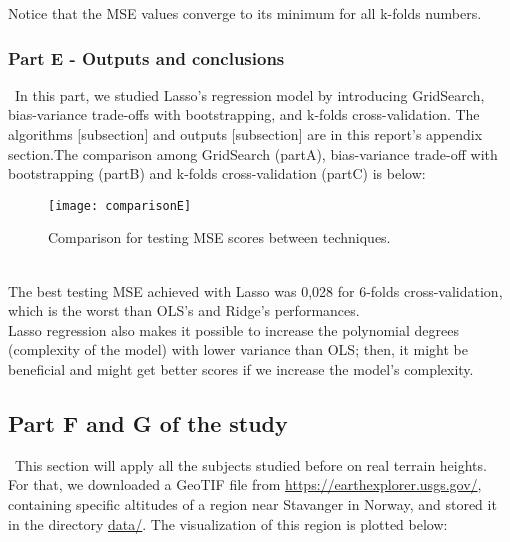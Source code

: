 Notice that the MSE values converge to its minimum for all k-folds numbers. \\

\subsubsection{Part E - Outputs and conclusions}
\label{chap:Part E - Outputs and conclusions}

\quad \, In this part, we studied Lasso's regression model by introducing GridSearch, bias-variance trade-offs with bootstrapping, and k-folds cross-validation. The algorithms [subsection] and outputs [subsection] are in this report's appendix section.The comparison among GridSearch (partA), bias-variance trade-off with bootstrapping (partB) and k-folds cross-validation (partC) is below: \\

\begin{figure}[H]
\label{fig:comparisonE}
\texttt{[image: comparisonE]}
\caption{Comparison for testing MSE scores between techniques.}
\centering
\end{figure}\\

The best testing MSE achieved with Lasso was 0,028 for 6-folds cross-validation, which is the worst than OLS's and Ridge's performances. \\

Lasso regression also makes it possible to increase the polynomial degrees (complexity of the model) with lower variance than OLS; then, it might be beneficial and might get better scores if we increase the model's complexity. \\

\subsection{Part F and G of the study}
\label{chap:Part F and G of the study}

\quad \, This section will apply all the subjects studied before on real terrain heights. For that, we downloaded a GeoTIF file from \href{https://earthexplorer.usgs.gov/}{https://earthexplorer.usgs.gov/}, containing specific altitudes of a region near Stavanger in Norway, and stored it in the directory \href{https://github.com/fabiorodp/UiO-FYS-STK4155/tree/master/Project1/data}{data/}. The visualization of this region is plotted below: \\

